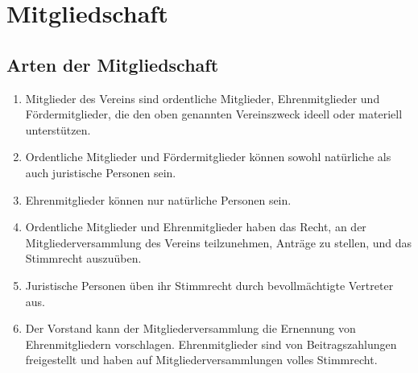 \documentclass[12pt,a4paper,draft]{article}
\begin{document}
\section{Mitgliedschaft}
\subsection{Arten der Mitgliedschaft}
\begin{enumerate}
\item Mitglieder des Vereins sind ordentliche Mitglieder, Ehrenmitglieder und 
Fördermitglieder, die den oben genannten Vereinszweck ideell oder materiell 
unterstützen.

\item Ordentliche Mitglieder und Fördermitglieder können sowohl natürliche als 
auch juristische Personen sein.

\item Ehrenmitglieder können nur natürliche Personen sein.

\item Ordentliche Mitglieder und Ehrenmitglieder haben das Recht, an der 
Mitgliederversammlung des Vereins teilzunehmen, Anträge zu stellen, und das 
Stimmrecht auszuüben.

\item Juristische Personen üben ihr Stimmrecht durch bevollmächtigte Vertreter 
aus.

\item Der Vorstand kann der Mitgliederversammlung die Ernennung von 
Ehrenmitgliedern vorschlagen. Ehrenmitglieder sind von Beitragszahlungen 
freigestellt und haben auf Mitgliederversammlungen volles Stimmrecht.
\end{enumerate}
\end{document}
